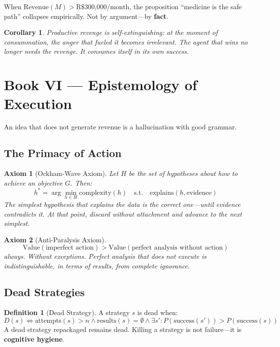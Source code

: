 \documentclass[12pt, a4paper]{article}
\newtheorem{axiom}{Axiom}
\newtheorem{corollary}{Corollary}
\theoremstyle{definition}
\newtheorem{definition}{Definition}
\theoremstyle{remark}
\begin{document}
When $\text{Revenue}(M) > \text{R\$300{,}000/month}$, the proposition ``medicine is the safe path'' collapses empirically. Not by argument—by \textbf{fact}.

\begin{corollary}
Productive revenge is self-extinguishing: at the moment of consummation, the anger that fueled it becomes irrelevant. The agent that wins no longer needs the revenge. It consumes itself in its own success.
\end{corollary}

\newpage


\section{Book VI — Epistemology of Execution}

\epigraph{An idea that does not generate revenue is a hallucination with good grammar.}{}

\subsection{The Primacy of Action}

\begin{axiom}[Ockham-Wave Axiom]
Let $H$ be the set of hypotheses about how to achieve an objective $G$. Then:
\[
h^* = \arg\min_{h \in H} \text{complexity}(h) \quad \text{s.t.} \quad \text{explains}(h, \text{evidence})
\]
The simplest hypothesis that explains the data is the correct one—until evidence contradicts it. At that point, discard without attachment and advance to the next simplest.
\end{axiom}

\begin{axiom}[Anti-Paralysis Axiom]
\[
\text{Value}(\text{imperfect action}) > \text{Value}(\text{perfect analysis without action})
\]
always. Without exceptions. Perfect analysis that does not execute is indistinguishable, in terms of results, from complete ignorance.
\end{axiom}

\subsection{Dead Strategies}

\begin{definition}[Dead Strategy]
A strategy $s$ is dead when:
\[
D(s) \iff \text{attempts}(s) > n \land \text{results}(s) = \emptyset \land \exists s' : P(\text{success}(s')) > P(\text{success}(s))
\]
A dead strategy repackaged remains dead. Killing a strategy is not failure—it is \textbf{cognitive hygiene}.
\end{definition}
\end{document}

